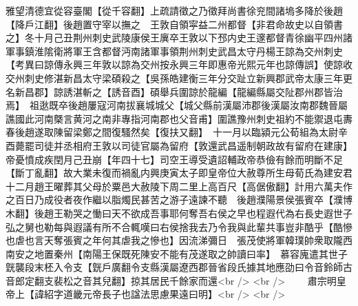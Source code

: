 雅望清德宜從容臺閣【從千容翻】上疏請徵之乃徵拜尚書徐兖間諸塢多降於後趙【降戶江翻】後趙置守宰以撫之　王敦自領寜益二州都督【非君命故史以自領書之】冬十月己丑荆州刺史武陵康侯王廙卒王敦以下邳内史王邃都督青徐幽平四州諸軍事鎮淮隂衛將軍王含都督沔南諸軍事領荆州刺史武昌太守丹楊王諒為交州刺史　【考異曰諒傳永興三年敦以諒為交州按永興三年即惠帝光熙元年也諒傳誤】使諒收交州刺史修湛新昌太守梁碩殺之【吳孫皓建衡三年分交趾立新興郡武帝太康三年更名新昌郡】諒誘湛斬之【誘音酉】碩舉兵圍諒於龍編【龍編縣屬交阯郡州郡皆治焉】　祖逖既卒後趙屢寇河南拔襄城城父【城父縣前漢屬沛郡後漢屬汝南郡魏晉屬譙國此河南槩言黄河之南非專指河南郡也父音甫】圍譙豫州刺史祖約不能禦退屯夀春後趙遂取陳留梁鄭之間復騷然矣【復扶又翻】　十一月以臨潁元公荀組為太尉辛酉薨罷司徒并丞相府王敦以司徒官屬為留府【敦還武昌遥制朝政故有留府在建康】　帝憂憤成疾閏月己丑崩【年四十七】司空王導受遺詔輔政帝恭儉有餘而明斷不足【斷丁亂翻】故大業未復而禍亂内興庚寅太子即皇帝位大赦尊所生母荀氏為建安君　十二月趙王曜葬其父母於粟邑大赦陵下周二里上高百尺【高倨傲翻】計用六萬夫作之百日乃成役者夜作繼以脂燭民甚苦之游子遠諫不聽　後趙濮陽景侯張賓卒【濮博木翻】後趙王勒哭之慟曰天不欲成吾事耶何奪吾右侯之早也程遐代為右長史遐世子弘之舅也勒每與遐議有所不合輒嘆曰右侯捨我去乃令我與此輩共事豈非酷乎【酷慘也虐也言天奪張賓之年何其虐我之慘也】因流涕彌日　張茂使將軍韓璞帥衆取隴西南安之地置秦州【南陽王保既死陳安不能有茂遂取之帥讀曰率】　慕容廆遣其世子皝襲段末柸入令支【皝戶廣翻令支縣漢屬遼西郡晉省段氏據其地應劭曰令音鈴師古音郎定翻支裴松之音其兒翻】掠其居民千餘家而還<br />
<br />
　　肅宗明皇帝上【諱紹字道畿元帝長子也諡法思慮果遠曰明】<br />
<br />
